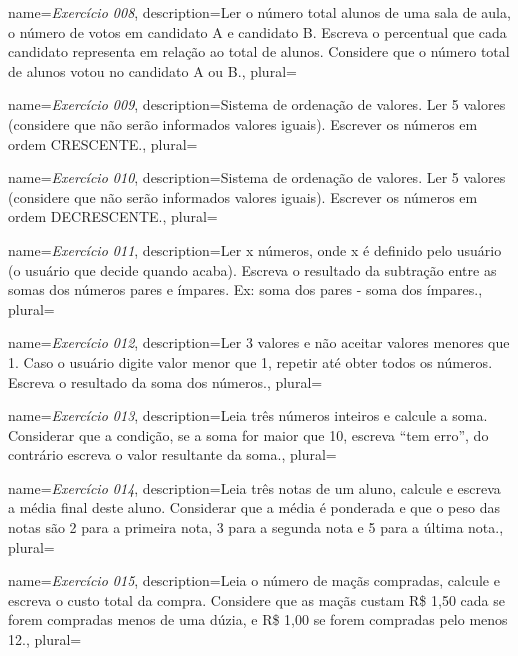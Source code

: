 {
	name={\textit{Exercício 008}},
	description={Ler o número total alunos de uma sala de aula, o número de votos em candidato A e candidato B. Escreva o percentual que cada candidato representa em relação ao total de	alunos. Considere que o número total de alunos votou no candidato A ou B.},
	plural={}
}



{
	name={\textit{Exercício 009}},
	description={Sistema de ordenação de valores. Ler 5 valores (considere que não serão informados valores iguais). Escrever os números em ordem CRESCENTE.},
	plural={}
}



{
	name={\textit{Exercício 010}},
	description={Sistema de ordenação de valores. Ler 5 valores (considere que não serão informados valores iguais). Escrever os números em ordem DECRESCENTE.},
	plural={}
}


{
	name={\textit{Exercício 011}},
	description={Ler x números, onde x é definido pelo usuário (o usuário que decide quando acaba). Escreva o resultado da subtração entre as somas dos números pares e ímpares. Ex: soma dos pares - soma dos ímpares.},
	plural={}
}

{
	name={\textit{Exercício 012}},
	description={Ler 3 valores e não aceitar valores menores que 1. Caso o usuário digite valor menor que 1, repetir até obter todos os números. Escreva o resultado da soma dos números.},
	plural={}
}




{
	name={\textit{Exercício 013}},
	description={Leia três números inteiros e calcule a soma. Considerar que a condição, se a soma for maior que 10, escreva “tem erro”, do contrário escreva o valor resultante da soma.},
	plural={}
}



{
	name={\textit{Exercício 014}},
	description={Leia três notas de um aluno, calcule e escreva a média final deste
		aluno. Considerar que a média é ponderada e que o peso das notas são 2 para a primeira nota, 3 para a segunda nota e 5 para a última nota.},
	plural={}
}




{
	name={\textit{Exercício 015}},
	description={Leia o número de maçãs compradas, calcule e escreva o custo total da compra. Considere que as maçãs custam R\$ 1,50 cada se forem compradas menos de uma dúzia, e R\$ 1,00 se forem compradas pelo menos 12.},
	plural={}
}


